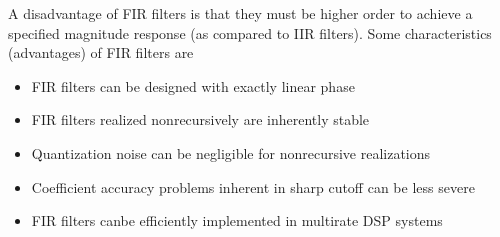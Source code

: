 \documentclass[11pt]{book}
\theoremstyle{example}
\begin{document}
A disadvantage of FIR filters is that they must be higher order to achieve a specified magnitude response (as compared to IIR filters). Some characteristics (advantages) of FIR filters are
\begin{itemize}
	\item FIR filters can be designed with exactly linear phase
	\item FIR filters realized nonrecursively are inherently stable
	\item Quantization noise can be negligible for nonrecursive realizations
	\item Coefficient accuracy problems inherent in sharp cutoff can be less severe
	\item FIR filters canbe efficiently implemented in multirate DSP systems
\end{itemize}
\end{document}

